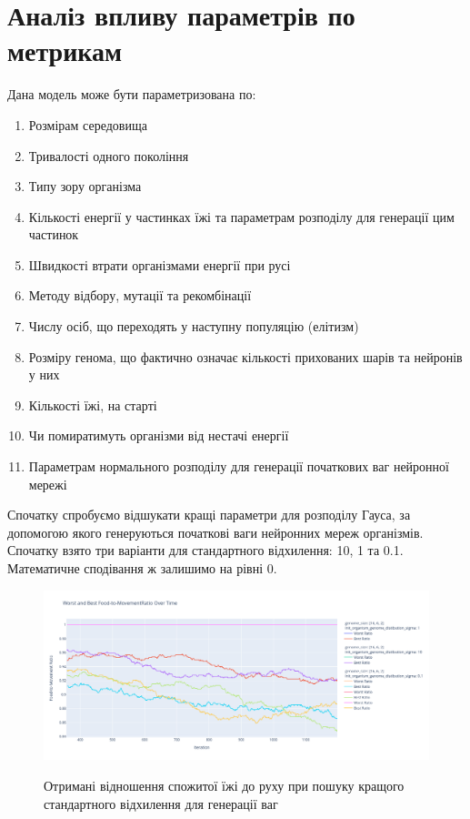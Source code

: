 \section{Аналіз впливу параметрів по метрикам}

Дана модель може бути параметризована по:
\begin{enumerate}
  \item Розмірам середовища
  \item Тривалості одного покоління
  \item Типу зору організма
  \item Кількості енергії у частинках їжі та параметрам
    розподілу для генерації цим частинок
  \item Швидкості втрати організмами енергії при русі
  \item Методу відбору, мутації та рекомбінації
  \item Числу осіб, що переходять у наступну популяцію (елітизм)
  \item Розміру генома, що фактично означає кількості прихованих шарів
    та нейронів у них
  \item Кількості їжі, на старті
  \item Чи помиратимуть організми від нестачі енергії
  \item Параметрам нормального розподілу для генерації
    початкових ваг нейронної мережі
\end{enumerate}


Спочатку спробуємо відшукати кращі параметри для розподілу Гауса,
за допомогою якого генеруються початкові ваги нейронних мереж організмів.
Спочатку взято три варіанти для стандартного відхилення: 10, 1 та 0.1.
Математичне сподівання ж залишимо на рівні 0.

\begin{figure}[ht]
  \centering
  \caption{Отримані відношення спожитої їжі до руху при 
  пошуку кращого стандартного відхилення для генерації ваг}
  \includegraphics[scale=0.35]{Images/best_sigma_comparing_by_food_to_movement.png}
  \label{fig:отримані-відношення-спожитої-їжі-до-руху-при-пошуку-кращого-стандартного-відхилення-для-генерації-ваг}
\end{figure}

